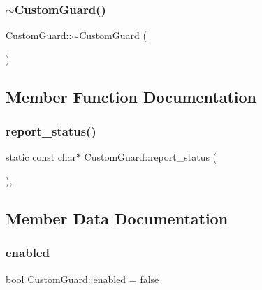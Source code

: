 \mbox{\label{struct_custom_guard_a2028de7d9d97016bc574532f3f3decac}} 
\subsubsection{\texorpdfstring{$\sim$CustomGuard()}{~CustomGuard()}}
{\footnotesize\ttfamily Custom\+Guard\+::$\sim$\+Custom\+Guard (\begin{DoxyParamCaption}{ }\end{DoxyParamCaption})\hspace{0.3cm}{\ttfamily [inline]}}



\subsection{Member Function Documentation}
\mbox{\label{struct_custom_guard_a72c42a4c096fe8dd486b41fac5b71f79}} 
\subsubsection{\texorpdfstring{report\_status()}{report\_status()}}
{\footnotesize\ttfamily static const char$\ast$ Custom\+Guard\+::report\+\_\+status (\begin{DoxyParamCaption}{ }\end{DoxyParamCaption})\hspace{0.3cm}{\ttfamily [inline]}, {\ttfamily [static]}}



\subsection{Member Data Documentation}
\mbox{\label{struct_custom_guard_a5841df8ac0a6f19736b423adce7a9405}} 
\subsubsection{\texorpdfstring{enabled}{enabled}}
{\footnotesize\ttfamily \mbox{\hyperlink{asdl_8h_af6a258d8f3ee5206d682d799316314b1}{bool}} Custom\+Guard\+::enabled = \mbox{\hyperlink{asdl_8h_af6a258d8f3ee5206d682d799316314b1ae9de385ef6fe9bf3360d1038396b884c}{false}}\hspace{0.3cm}{\ttfamily [static]}}




